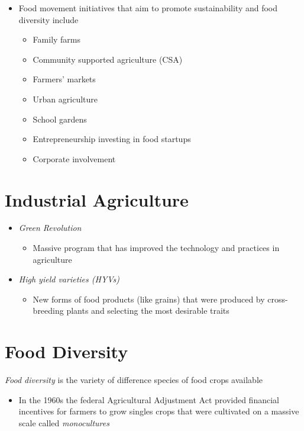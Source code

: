 \documentclass[title={Chapter 13}]{fdsn201notes}
\begin{document}
\begin{itemize}
	\item Food movement initiatives that aim to promote sustainability and food diversity include
	\begin{itemize}
		\item Family farms
		\item Community supported agriculture (CSA)
		\item Farmers’ markets
		\item Urban agriculture
		\item School gardens
		\item Entrepreneurship investing in food startups
		\item Corporate involvement
	\end{itemize}
\end{itemize}

\section{Industrial Agriculture}\label{sec:industrial-agriculture}
\begin{itemize}
	\item \emph{Green Revolution}
	\begin{itemize}
		\item Massive program that has improved the technology and practices in agriculture
	\end{itemize}
	\item \emph{High yield varieties (HYVs)}
	\begin{itemize}
		\item New forms of food products (like grains) that were produced by cross-breeding plants and selecting the most desirable traits
	\end{itemize}
\end{itemize}

\section{Food Diversity}\label{sec:food-diversity}
\emph{Food diversity} is the variety of difference species of food crops available
\begin{itemize}
	\item In the 1960s the federal Agricultural Adjustment Act provided financial incentives for farmers to grow singles crops that were cultivated on a massive scale called \emph{monocultures}
\end{itemize}
\end{document}
